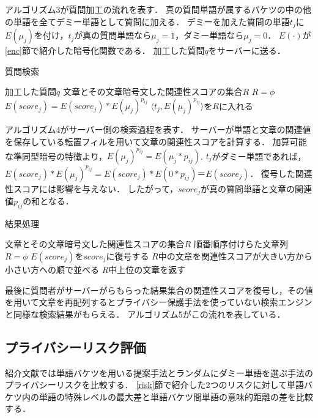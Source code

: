 \documentclass{jsarticle}
\theoremstyle{definition}
\begin{document}
アルゴリズム3が質問加工の流れを表す．
真の質問単語が属するバケツの中の他の単語を全てデミー単語として質問に加える．
デミーを加えた質問の単語$t_j$に$E(\mu_j)$を付け，$t_j$が真の質問単語なら$\mu_j=1$，ダミー単語なら$\mu_j=0$．
$E(\cdot)$が\ref{enc}節で紹介した暗号化関数である．
加工した質問$q$をサーバーに送る．

\begin{algorithm}
\caption{質問検索}
\begin{algorithmic}[1]
	\Require 加工した質問$q$
	\Ensure 文章とその文章暗号文した関連性スコアの集合$R$
	\State $R=\phi$
		\State $E(score_j)=E(score_j)*E(\mu_j)^{p_{ij}}$
		\Else 
		\State $\langle t_j,E(\mu_j)^{p_{ij}}\rangle$を$R$に入れる
		\EndIf
		\EndFor
	\EndFor
\EndFunction
\end{algorithmic}
\end{algorithm}

アルゴリズム4がサーバー側の検索過程を表す．
サーバーが単語と文章の関連値を保存している転置フィルを用いて文章の関連性スコアを計算する．
加算可能な準同型暗号の特徴より，$E(\mu_j)^{p_{ij}}=E(\mu_j*p_{ij})$.
$t_j$がダミー単語であれば，$E(score_j)*E(\mu_j)^{p_{ij}}=E(score_j)*E(0*p_{ij})＝E(score_j)$．
復号した関連性スコアには影響を与えない．
したがって，$score_j$が真の質問単語と文章の関連値$p_{ij}$の和となる．

\begin{algorithm}
\caption{結果処理}
\begin{algorithmic}[1]
	\Require 文章とその文章暗号文した関連性スコアの集合$R$
	\Ensure 順番順序付けらた文章列
	\State $R=\phi$
		\State $E(score_j)$を$score_j$に復号する
	\EndFor
	\State $R$中の文章を関連性スコアが大きい方から小さい方への順で並べる
	\State $R$中上位の文章を返す
\EndFunction
\end{algorithmic}
\end{algorithm}

最後に質問者がサーバーがらもらった結果集合の関連性スコアを復号し，その値を用いて文章を再配列するとプライバシー保護手法を使っていない検索エンジンと同様な検索結果がもらえる．
アルゴリズム5がこの流れを表している．

\subsection{プライバシーリスク評価}
\label{ex}
紹介文献では単語バケツを用いる提案手法とランダムにダミー単語を選ぶ手法のプライバシーリスクを比較する．
\ref{risk}節で紹介した2つのリスクに対して単語バケツ内の単語の特殊レベルの最大差と単語バケツ間単語の意味的距離の差を比較する．
\end{document}
